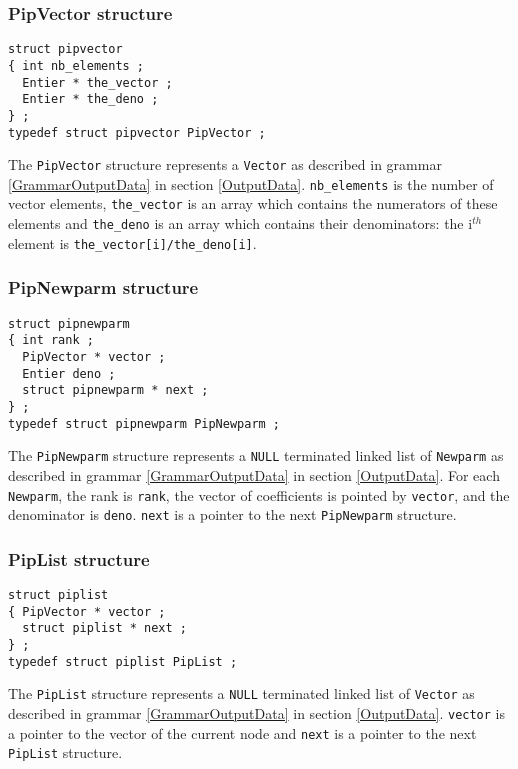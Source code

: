\documentclass[12pt,a4paper,dvips]{article}
\begin{document}
\subsubsection{PipVector structure}
\begin{verbatim}
struct pipvector
{ int nb_elements ;
  Entier * the_vector ;
  Entier * the_deno ;
} ;
typedef struct pipvector PipVector ;
\end{verbatim}
The {\tt PipVector} structure represents a {\tt Vector}
as described in grammar \ref{GrammarOutputData} in section \ref{OutputData}.
{\tt nb\_elements} is the number of vector elements, {\tt the\_vector} is
an array which contains the numerators of these elements and {\tt the\_deno}
is an array which contains their denominators: the i$^{th}$ element is
{\tt the\_vector[i]/the\_deno[i]}.

\subsubsection{PipNewparm structure}
\begin{verbatim}
struct pipnewparm
{ int rank ;
  PipVector * vector ;
  Entier deno ;
  struct pipnewparm * next ;
} ;
typedef struct pipnewparm PipNewparm ;
\end{verbatim}
The {\tt PipNewparm} structure represents a {\tt NULL} terminated linked list of
{\tt Newparm} as described in grammar \ref{GrammarOutputData}
in section \ref{OutputData}. For each {\tt Newparm}, the rank is {\tt rank},
the vector of coefficients is pointed by {\tt vector}, and the denominator
is {\tt deno}. {\tt next} is a pointer to the next {\tt PipNewparm} structure.

\subsubsection{PipList structure}
\begin{verbatim}
struct piplist
{ PipVector * vector ;
  struct piplist * next ;
} ;
typedef struct piplist PipList ;
\end{verbatim}
The {\tt PipList} structure represents a {\tt NULL} terminated linked list of
{\tt Vector} as described in grammar \ref{GrammarOutputData} in section
\ref{OutputData}. {\tt vector} is a pointer to the vector of the current node and
{\tt next} is a pointer to the next {\tt PipList} structure.
\end{document}
